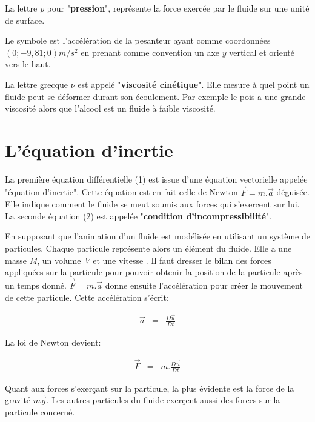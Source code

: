 \documentclass[11pt]{report}
\begin{document}
La lettre \textit{p} pour "\textbf{pression}", représente la force exercée par le fluide sur une unité de surface. \newline

Le symbole  est l'accélération de la pesanteur ayant comme coordonnées $(0; -9,81; 0) m/s^2 $ en prenant comme convention un axe $ y $ vertical et orienté vers le haut. \newline

La lettre grecque $\nu$ est appelé "\textbf{viscosité cinétique}". Elle mesure à quel point un fluide peut se déformer durant son écoulement. Par exemple le pois a une grande viscosité alors que l'alcool est un fluide à faible viscosité.

\section{L'équation d'inertie}

La première équation différentielle (1) est issue d'une équation vectorielle appelée "équation d'inertie". Cette équation est en fait celle de Newton $ \overrightarrow{F} = m. \overrightarrow{a} $ déguisée. Elle indique comment le fluide se meut soumis aux forces qui s'exercent sur lui. La seconde équation (2) est appelée "\textbf{condition d'incompressibilité}".

En supposant que l'animation d'un fluide est modélisée en utilisant un système de particules. Chaque particule représente alors un élément du fluide. Elle a une masse \textit{M}, un volume \textit{V} et une vitesse . Il faut dresser le bilan des forces appliquées sur la particule pour pouvoir obtenir la position de la particule après un temps donné. $ \overrightarrow{F} = m. \overrightarrow{a} $ donne ensuite l'accélération pour créer le mouvement de cette particule. Cette accélération s'écrit:

\begin{eqnarray}
\overrightarrow{a} & = & \frac{D \overrightarrow{u}}{Dt}
\end{eqnarray}

La loi de Newton devient:

\begin{eqnarray}
\overrightarrow{F} & = & m. \frac{D \overrightarrow{u}}{Dt}
\end{eqnarray}

Quant aux forces s'exerçant sur la particule, la plus évidente est la force de la gravité $ m\overrightarrow{g} $. Les autres particules du fluide exerçent aussi des forces sur la particule concerné. \newline
\end{document}
